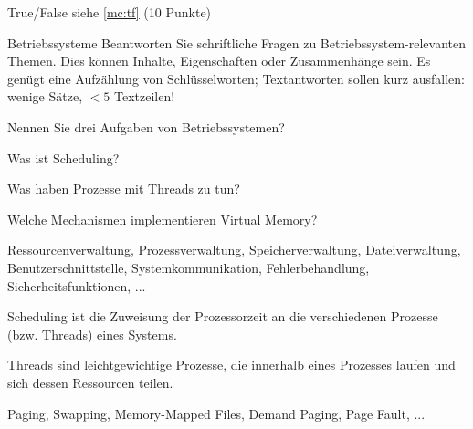 \documentclass{exercisesheet}
\begin{document}
\begin{exercise}{True/False}
  siehe \ref{mc:tf} \hfill(10 Punkte)
\end{exercise}

\begin{eexercises}[14]{Betriebssysteme}{
    Beantworten Sie schriftliche Fragen zu Betriebssystem-relevanten Themen. Dies können Inhalte, Eigenschaften oder Zusammenhänge sein. Es genügt eine Aufzählung von Schlüsselworten; Textantworten sollen kurz ausfallen: wenige Sätze, $<5$ Textzeilen!
  }
  \item Nennen Sie drei Aufgaben von Betriebssystemen?\points[3]
  \item Was ist Scheduling?\points[5]
  \item Was haben Prozesse mit Threads zu tun?\points[4]
  \item Welche Mechanismen implementieren Virtual Memory?\points[3]
\end{eexercises}

\begin{solutions}
  \item Ressourcenverwaltung, Prozessverwaltung, Speicherverwaltung, Dateiverwaltung, Benutzerschnittstelle, Systemkommunikation, Fehlerbehandlung, Sicherheitsfunktionen, ...
  \item Scheduling ist die Zuweisung der Prozessorzeit an die verschiedenen Prozesse (bzw. Threads) eines Systems.
  \item Threads sind leichtgewichtige Prozesse, die innerhalb eines Prozesses laufen und sich dessen Ressourcen teilen.
  \item Paging, Swapping, Memory-Mapped Files, Demand Paging, Page Fault, ...
\end{solutions}
\end{document}
